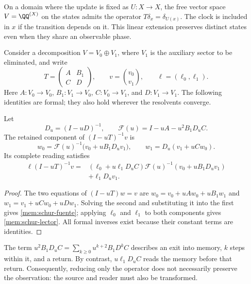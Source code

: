 On a domain where the update is fixed as \(U:X\to X\),
the free vector space \(V=\QQ^{(X)}\) on the states admits the operator
\(T\delta_x=\delta_{U(x)}\). The clock is included in \(x\) if the
transition depends on it. This linear extension preserves distinct states
even when they share an observable phase.

Consider a decomposition \(V=V_0\oplus V_1\), where \(V_1\)
is the auxiliary sector to be eliminated, and write
\[
 T=\begin{pmatrix}A&B_1\\C&D\end{pmatrix},\qquad
 v=\binom{v_0}{v_1},\qquad \ell=(\ell_0,\ell_1).
\]
Here \(A:V_0\to V_0\), \(B_1:V_1\to V_0\),
\(C:V_0\to V_1\), and \(D:V_1\to V_1\).
The following identities are formal; they also hold wherever the
resolvents converge.

\begin{proposition}
\label{mem:prop-schur}
Let
\[
 D_u=(I-uD)^{-1},\qquad
 \mathscr F(u)=I-uA-u^2B_1D_uC.
\]
The retained component of \((I-uT)^{-1}v\) is
\begin{equation}
 w_0=\mathscr F(u)^{-1}\bigl(v_0+uB_1D_uv_1\bigr),
 \qquad w_1=D_u(v_1+uCw_0).
 \label{mem:schur-fuente}
\end{equation}
Its complete reading satisfies
\begin{equation}
 \begin{split}
 \ell(I-uT)^{-1}v
 ={}&(\ell_0+u\ell_1D_uC)
       \mathscr F(u)^{-1}(v_0+uB_1D_uv_1)\\
    &+\ell_1D_uv_1.
 \end{split}
 \label{mem:schur-lector}
\end{equation}
\end{proposition}
\begin{proof}
The two equations of \((I-uT)w=v\) are
\(w_0=v_0+uAw_0+uB_1w_1\) and
\(w_1=v_1+uCw_0+uDw_1\).
Solving the second and substituting it into the first gives
\eqref{mem:schur-fuente}; applying \(\ell_0\) and \(\ell_1\)
to both components gives \eqref{mem:schur-lector}.
All formal inverses exist because their constant terms
are identities.
\end{proof}

The term \(u^2B_1D_uC=\sum_{k\geq0}u^{k+2}B_1D^kC\)
describes an exit into memory, \(k\) steps within it, and
a return. By contrast, \(u\ell_1D_uC\) reads the memory before that
return. Consequently, reducing only the operator does not necessarily preserve
the observation: the source and reader must also be transformed.

